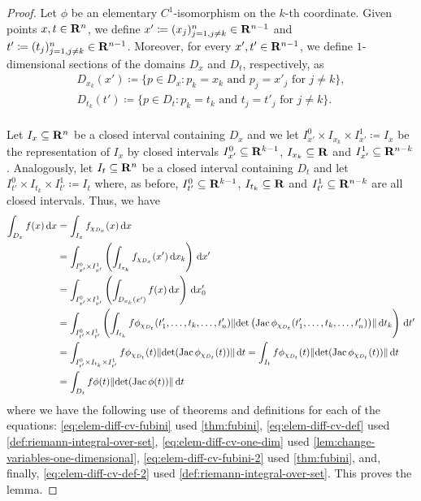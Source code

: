 \begin{proof}
Let \(\phi\) be an elementary \(C^1\)-isomorphism on the \(k\)-th
coordinate. Given points \(x, t \in \mathbf{R}^n\), we define \(x' \coloneq (x_j)_{j=1,
j \neq k}^n \in \mathbf{R}^{n-1}\) and \(t' \coloneq (t_j)_{j=1, j \neq k}^n \in
\mathbf{R}^{n-1}\). Moreover, for every \(x', t' \in \mathbf{R}^{n-1}\), we define
\(1\)-dimensional sections of the domains \(D_x\) and \(D_t\), respectively, as
\begin{gather*}
  D_{x_k}(x') \coloneq
  \{p \in D_x \colon p_k = x_k \text{ and } p_j = x'_j \text{ for } j \neq k\}, \\
  D_{t_k}(t') \coloneq
  \{p \in D_t \colon p_k = t_k \text{ and } t_j = t'_j \text{ for } j \neq k\}. \\
\end{gather*}

Let \(I_x \subseteq \mathbf{R}^n\) be a closed interval containing \(D_x\) and we let
\(I_{x'}^0 \times I_{x_k} \times I_{x'}^1 \coloneq I_x\) be the representation
of \(I_x\) by closed intervals \(I_{x'}^0 \subseteq \mathbf{R}^{k-1}\), \(I_{x_k}
\subseteq \mathbf{R}\) and \(I_{x'}^1 \subseteq \mathbf{R}^{n-k}\). Analogously, let \(I_t
\subseteq \mathbf{R}^n\) be a closed interval containing \(D_t\) and let \(I_{t'}^0
\times I_{t_k} \times I_{t'}^1 \coloneq I_t\) where, as before, \(I_{t'}^0
\subseteq \mathbf{R}^{k-1}\), \(I_{t_k} \subseteq \mathbf{R}\) and \(I_{t'}^1 \subseteq
\mathbf{R}^{n-k}\) are all closed intervals. Thus, we have
{\small
\begin{align}
  \nonumber
  \int_{D_x} f(x)\, \mathrm{d} x
  &= \int_{I_x} f_{\chi_{D_x}}(x)\, \mathrm{d} x \\
  \label{eq:elem-diff-cv-fubini}
  &= \int_{I_{x'}^0 \times I_{x'}^1} \left(
  \int_{I_{x_k}} f_{\chi_{D_x}}(x')\, \mathrm{d} x_k
  \right)\, \mathrm{d} x' \\
  \label{eq:elem-diff-cv-def}
  &= \int_{I_{x'}^0 \times I_{x'}^1} \left(
    \int_{D_{x_k}(x')} f(x)\, \mathrm{d} x
    \right)\, \mathrm{d} x_0' \\
  \label{eq:elem-diff-cv-one-dim}
  &= \int_{I_{t'}^0 \times I_{t'}^1} \left(
    \int_{I_{t_k}} f\phi_{\chi_{D_t}}(t_1', \dots, t_k, \dots, t_n')
    \lVert\det\left( \operatorname{Jac} \phi_{\chi_{D_t}}(t_1', \dots, t_k, \dots, t_n')
    \right)\rVert\, \mathrm{d} t_k \right)\, \mathrm{d} t' \\
  \label{eq:elem-diff-cv-fubini-2}
  &= \int_{I_{t'}^0 \times I_{t_k} \times I_{t'}^1}
    f \phi_{\chi_{D_t}}(t) \lVert\det(\operatorname{Jac} \phi_{\chi_{D_t}}(t))\rVert\, \mathrm{d} t
  = \int_{I_t}
    f \phi_{\chi_{D_t}}(t) \lVert\det(\operatorname{Jac} \phi_{\chi_{D_t}}(t))\rVert\, \mathrm{d} t
  \\
  \label{eq:elem-diff-cv-def-2}
  &= \int_{D_t} f \phi(t) \lVert\det(\operatorname{Jac} \phi(t))\rVert\, \mathrm{d} t
\end{align}
}
where we have the following use of theorems and definitions for each of the
equations: \cref{eq:elem-diff-cv-fubini} used \cref{thm:fubini},
\cref{eq:elem-diff-cv-def} used \cref{def:riemann-integral-over-set},
\cref{eq:elem-diff-cv-one-dim} used \cref{lem:change-variables-one-dimensional},
\cref{eq:elem-diff-cv-fubini-2} used \cref{thm:fubini}, and, finally,
\cref{eq:elem-diff-cv-def-2} used \cref{def:riemann-integral-over-set}. This
proves the lemma.
\end{proof}

